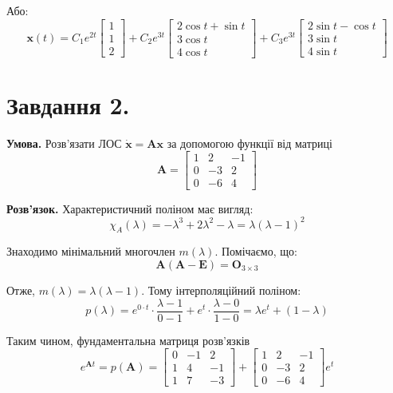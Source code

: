 \documentclass[14pt]{extarticle}
\begin{document}
Або:
\[
\mathbf{x}(t) = C_1e^{2t}\begin{bmatrix}
    1 \\ 1 \\ 2
\end{bmatrix} + C_2e^{3t}\begin{bmatrix}
    2\cos t + \sin t \\ 3 \cos t \\ 4 \cos t
\end{bmatrix} + C_3e^{3t}\begin{bmatrix}
    2\sin t - \cos t \\ 3\sin t \\ 4 \sin t
\end{bmatrix}
\]

\section*{Завдання 2.} 

\textbf{Умова.} Розв’язати ЛОС $\dot{\textbf{x}}=\boldsymbol{A}\textbf{x}$ за допомогою функції від матриці
\[
\boldsymbol{A} = \begin{bmatrix}
    1 & 2 & -1 \\
    0 & -3 & 2 \\
    0 & -6 & 4
\end{bmatrix}
\]

\textbf{Розв'язок.} Характеристичний поліном має вигляд:
\[
\chi_A(\lambda) = -\lambda^3+2\lambda^2-\lambda = \lambda(\lambda-1)^2
\]

Знаходимо мінімальний многочлен $m(\lambda)$. Помічаємо, що:
\[
\boldsymbol{A}(\boldsymbol{A} - \boldsymbol{E}) = \boldsymbol{O}_{3 \times 3}
\]

Отже, $m(\lambda)=\lambda(\lambda-1)$. Тому інтерполяційний поліном:
\[
p(\lambda) = e^{0\cdot t} \cdot \frac{\lambda - 1}{0 - 1} + e^{t}\cdot \frac{\lambda-0}{1-0} = \lambda e^t + (1-\lambda)
\]

Таким чином, фундаментальна матриця розв'язків
\[
e^{\boldsymbol{A}t} = p(\boldsymbol{A}) = \begin{bmatrix}
    0 & -1 & 2 \\ 1 & 4 & -1 \\ 1 & 7 & -3
\end{bmatrix} + \begin{bmatrix}
    1 & 2 & -1 \\ 0 & -3 & 2 \\ 0 & -6 & 4
\end{bmatrix}e^{t}
\]
\end{document}
